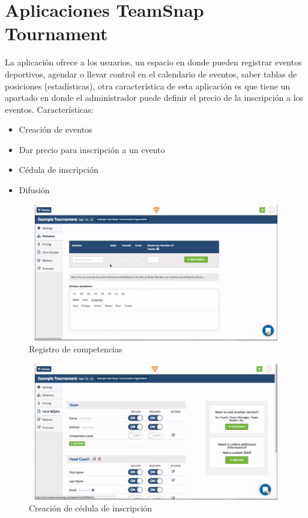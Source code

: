 \section{Aplicaciones TeamSnap Tournament}
\noindent La aplicación ofrece a los usuarios, un espacio en donde pueden registrar eventos deportivos, agendar o llevar control en el calendario de eventos, saber tablas de posiciones (estadísticas), otra característica de esta aplicación es que tiene un apartado en donde el administrador puede definir el precio de la inscripción a los eventos. \cite{team}
Características: 
\begin{itemize}
	\item Creación de eventos
	\item Dar precio para inscripción a un evento
	\item Cédula de inscripción
	\item Difusión
\end{itemize}
\begin{figure}[hbt]
	\centering
	\includegraphics[width=12cm, height=6cm]{Imagenes/Aplicaciones/TsT1.png}
	\caption{Registro de competencias}
\end{figure}
\pagebreak
\begin{figure}[hbt]
	\centering
	\includegraphics[width=12cm, height=6cm]{Imagenes/Aplicaciones/TsT2.png}
	\caption{Creación de cédula de inscripción}
\end{figure}
